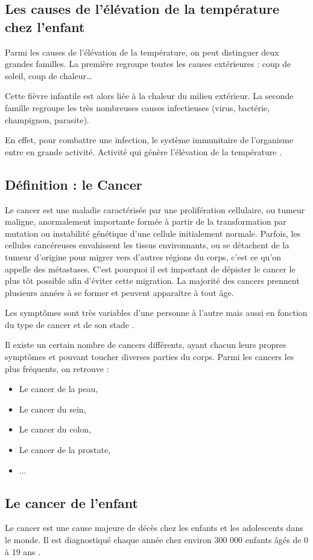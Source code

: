 \documentclass[12pt]{article}
\begin{document}
\subsection{Les causes de l'élévation de la température chez l’enfant}
Parmi les causes de l'élévation de la température, on peut distinguer deux grandes familles. La première regroupe toutes les causes extérieures : coup de soleil, coup de chaleur… 

Cette fièvre infantile est alors liée à la chaleur du milieu extérieur. La seconde famille regroupe les très nombreuses causes infectieuses (virus, bactérie, champignon, parasite).

En effet, pour combattre une infection, le système immunitaire de l’organisme entre en grande activité. Activité qui génère l’élévation de la température \cite{30}.

\subsection{Définition : le Cancer}
Le cancer est une maladie caractérisée par une prolifération cellulaire, ou tumeur maligne, anormalement importante formée à partir de la transformation par mutation ou instabilité génétique d'une cellule initialement normale. Parfois, les cellules cancéreuses envahissent les tissus environnants, ou se détachent de la tumeur d'origine pour migrer vers d'autres régions du corps, c'est ce qu'on appelle des métastases. C'est pourquoi il est important de dépister le cancer le plus tôt possible afin d'éviter cette migration. La majorité des cancers prennent plusieurs années à se former et peuvent apparaître à tout âge. 

Les symptômes sont très variables d'une personne à l'autre mais aussi en fonction du type de cancer et de son stade \cite{31}.

Il existe un certain nombre de cancers différents, ayant chacun leurs propres symptômes et pouvant toucher diverses parties du corps. Parmi les cancers les plus fréquents, on retrouve :
\begin{itemize}
	\item  Le cancer de la peau,
	\item Le cancer du sein,
	\item Le cancer du colon,
	\item Le cancer de la prostate,
	\item ...
\end{itemize}

\subsection{Le cancer de l’enfant}
Le cancer est une cause majeure de décès chez les enfants et les adolescents dans le monde. Il est diagnostiqué chaque année chez environ 300 000 enfants âgés de 0 à 19 ans \cite{32}.
\end{document}
